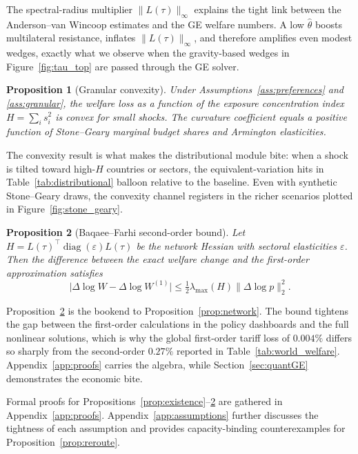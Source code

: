 \documentclass[12pt]{article}
\newtheorem{proposition}{Proposition}
\begin{document}
The spectral-radius multiplier $\|L(\tau)\|_{\infty}$ explains the tight link between the Anderson--van Wincoop estimates and the GE welfare numbers. A low $\hat{\theta}$ boosts multilateral resistance, inflates $\|L(\tau)\|_{\infty}$, and therefore amplifies even modest wedges, exactly what we observe when the gravity-based wedges in Figure~\ref{fig:tau_top} are passed through the GE solver.

\begin{proposition}[Granular convexity]\label{prop:granular}
Under Assumptions~\ref{ass:preferences} and \ref{ass:granular}, the welfare loss as a function of the exposure concentration index $H=\sum_i s_i^2$ is convex for small shocks. The curvature coefficient equals a positive function of Stone--Geary marginal budget shares and Armington elasticities.
\end{proposition}

The convexity result is what makes the distributional module bite: when a shock is tilted toward high-$H$ countries or sectors, the equivalent-variation hits in Table~\ref{tab:distributional} balloon relative to the baseline. Even with synthetic Stone--Geary draws, the convexity channel registers in the richer scenarios plotted in Figure~\ref{fig:stone_geary}.

\begin{proposition}[Baqaee--Farhi second-order bound]\label{prop:bf_bound}
Let $H = L(\tau)^{\top}\operatorname{diag}(\varepsilon)L(\tau)$ be the network Hessian with sectoral elasticities $\varepsilon$. Then the difference between the exact welfare change and the first-order approximation satisfies
\begin{equation}
    \bigl|\Delta \log W - \Delta \log W^{(1)}\bigr| \leq \tfrac{1}{2} \lambda_{\max}(H) \|\Delta \log p\|_2^2.
\end{equation}
\end{proposition}

Proposition~\ref{prop:bf_bound} is the bookend to Proposition~\ref{prop:network}. The bound tightens the gap between the first-order calculations in the policy dashboards and the full nonlinear solutions, which is why the global first-order tariff loss of $0.004\%$ differs so sharply from the second-order $0.27\%$ reported in Table~\ref{tab:world_welfare}. Appendix~\ref{app:proofs} carries the algebra, while Section~\ref{sec:quantGE} demonstrates the economic bite.

Formal proofs for Propositions~\ref{prop:existence}--\ref{prop:bf_bound} are gathered in Appendix~\ref{app:proofs}. Appendix~\ref{app:assumptions} further discusses the tightness of each assumption and provides capacity-binding counterexamples for Proposition~\ref{prop:reroute}.
\end{document}
